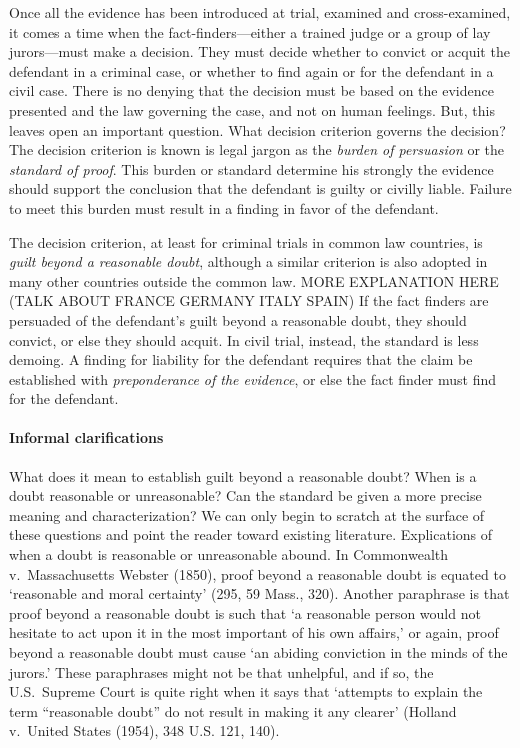 \documentclass[10pt]{article}
\begin{document}

Once all the evidence has been introduced at trial, examined and cross-examined, it comes a time when the fact-finders---either a trained judge or a group of lay jurors---must make a decision. They must decide whether to convict or acquit the defendant in a criminal case, or whether 
to find again or for the defendant in a civil case. There is no denying that the decision must be based 
on the evidence presented and the law governing the case, and not on human feelings. But, this leaves 
open an important question. What decision criterion governs the decision? The decision criterion is known is legal 
jargon as the \textit{burden of persuasion} or the \textit{standard of proof}. This burden or standard determine his strongly the evidence should support the conclusion that the defendant is guilty or civilly liable. Failure to meet this 
burden must result in a finding in favor of the defendant.

The decision criterion, at least for criminal trials in common law countries, is \textit{guilt beyond a reasonable doubt}, although a similar criterion is also adopted in many other countries outside the common law. MORE EXPLANATION HERE (TALK ABOUT FRANCE GERMANY ITALY SPAIN) 
If the fact finders are persuaded of the defendant's guilt beyond a reasonable doubt, they should convict, or else they should acquit. In civil trial, instead, the standard is less demoing. A finding for liability for the defendant requires that the claim be established with \textit{preponderance of the evidence}, or else the fact finder must find for the defendant. 

  
  \paragraph{Informal clarifications}
  What does  it mean to establish guilt beyond a reasonable doubt? When is a doubt reasonable or unreasonable? Can the standard be given a more precise meaning and characterization? We can only begin to scratch at the surface of these questions and point the reader toward existing literature. Explications of when a doubt is reasonable or unreasonable abound. In Commonwealth v.\ Massachusetts Webster (1850), 
proof beyond a reasonable doubt is equated to `reasonable and moral certainty' (295, 59 Mass., 320).  Another paraphrase is that proof beyond a reasonable doubt is such that `a reasonable person would not hesitate to act upon it in the most important of his own affairs,' or again, proof beyond a reasonable doubt must cause `an abiding conviction in the minds of the jurors.' These paraphrases might not be that unhelpful, and if so, the U.S.\ Supreme Court is quite right when it says that `attempts to explain the term ``reasonable doubt'' do not result in making it any clearer' (Holland v.\ United States (1954), 348 U.S. 121, 140). 
\end{document}
